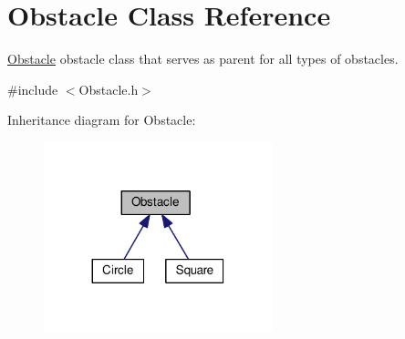 \hypertarget{classObstacle}{}\section{Obstacle Class Reference}
\label{classObstacle}


\hyperlink{classObstacle}{Obstacle} obstacle class that serves as parent for all types of obstacles.  




{\ttfamily \#include $<$Obstacle.\+h$>$}



Inheritance diagram for Obstacle\+:\nopagebreak
\begin{figure}[H]
\begin{center}
\leavevmode
\includegraphics[width=188pt]{classObstacle__inherit__graph}
\end{center}
\end{figure}
